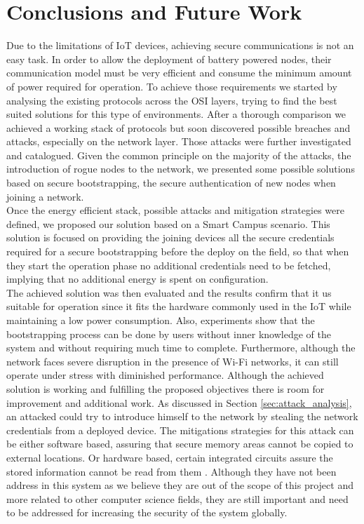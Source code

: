 
\chapter{Conclusions and Future Work}
\label{chapter:conclusion}
Due to the limitations of \gls{IoT} devices, achieving secure communications is not an easy task. In order to allow the deployment of battery powered nodes, their communication model must be very efficient and consume the minimum amount of power required for operation. To achieve those requirements we started by analysing the existing protocols across the OSI layers, trying to find the best suited solutions for this type of environments. After a thorough comparison we achieved a working stack of protocols but soon discovered possible breaches and attacks, especially on the network layer. Those attacks were further investigated and catalogued. Given the common principle on the majority of the attacks, the introduction of rogue nodes to the network, we presented some possible solutions based on secure bootstrapping, the secure authentication of new nodes when joining a network.\\
Once the energy efficient stack, possible attacks and mitigation strategies were defined, we proposed our solution based on a Smart Campus scenario. This solution is focused on providing the joining devices all the secure credentials required for a secure bootstrapping before the deploy on the field, so that when they start the operation phase no additional credentials need to be fetched, implying that no additional energy is spent on configuration.\\
The achieved solution was then evaluated and the results confirm that it us suitable for operation since it fits the hardware commonly used in the \gls{IoT} while maintaining a low power consumption. Also, experiments show that the bootstrapping process can be done by users without inner knowledge of the system and without requiring much time to complete. Furthermore, although the network faces severe disruption in the presence of Wi-Fi networks, it can still operate under stress with diminished performance.
Although the achieved solution is working and fulfilling the proposed objectives there is room for improvement and additional work. As discussed in Section \ref{sec:attack_analysis}, an attacked could try to introduce himself to the network by stealing the network credentials from a deployed device. The mitigations strategies for this attack can be either software based,  assuring that secure memory areas cannot be copied to external locations. Or hardware based, certain integrated circuits assure the stored information cannot be read from them \cite{Lesjak2014}. Although they have not been address in this system as we believe they are out of the scope of this project and more related to other computer science fields, they are still important and need to be addressed for increasing the security of the system globally.\\

